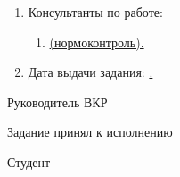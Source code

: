 \begin{enumerate}[1.]
		\begin{enumerate}[label=\theenumi\arabic*.]
			\item C\#, Go~--- языки программирования.
			\item Docker, Kubernetes~--- контейнеризация и~оркестрация.
			\item PostgreSQL~--- система управления базами данных.
			\item Yandex Cloud~--- облачная платформа.
		\end{enumerate}
		\item Консультанты по работе:
		\begin{enumerate}[label=\theenumi\arabic*.]
		\item \uline{\emakefirstuc{\ConsultantNormDegree} \ConsultantNorm{} (нормоконтроль).} %
	\end{enumerate}
		\item Дата выдачи задания: \uline{\thesisStartDate.}
\end{enumerate}

\intervalS%

Руководитель ВКР \uline{\hspace*{0.1\textheight} \Supervisor}


\intervalS%


Задание принял к исполнению \uline{\thesisStartDate}

\intervalS%

Студент \uline{\hspace*{0.1\textheight}  \Author}



